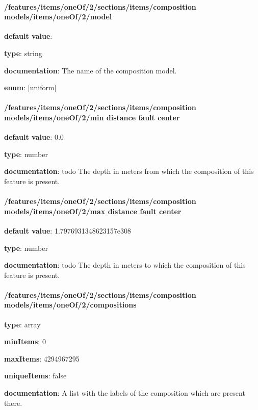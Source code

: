 \paragraph{/features/items/oneOf/2/sections/items/composition models/items/oneOf/2/model} \begin{itemized}
\item {\bf default value}: 
\item {\bf type}: string
\item {\bf documentation}: The name of the composition model.
\item {\bf enum}: [uniform]\end{itemized}\paragraph{/features/items/oneOf/2/sections/items/composition models/items/oneOf/2/min distance fault center} \begin{itemized}
\item {\bf default value}: 0.0
\item {\bf type}: number
\item {\bf documentation}: todo The depth in meters from which the composition of this feature is present.
\end{itemized}\paragraph{/features/items/oneOf/2/sections/items/composition models/items/oneOf/2/max distance fault center} \begin{itemized}
\item {\bf default value}: 1.7976931348623157e308
\item {\bf type}: number
\item {\bf documentation}: todo The depth in meters to which the composition of this feature is present.
\end{itemized}\paragraph{/features/items/oneOf/2/sections/items/composition models/items/oneOf/2/compositions} \begin{itemized}
\item {\bf type}: array
\item {\bf minItems}: 0
\item {\bf maxItems}: 4294967295
\item {\bf uniqueItems}: false
\item {\bf documentation}: A list with the labels of the composition which are present there.

\end{itemized}
